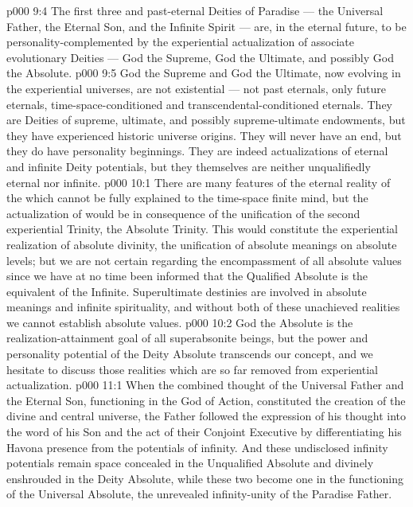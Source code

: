 \vs p000 9:4 The first three and past\hyp{}eternal Deities of Paradise --- the Universal Father, the Eternal Son, and the Infinite Spirit --- are, in the eternal future, to be personality\hyp{}complemented by the experiential actualization of associate evolutionary Deities --- God the Supreme, God the Ultimate, and possibly God the Absolute.
\vs p000 9:5 \pc God the Supreme and God the Ultimate, now evolving in the experiential universes, are not existential --- not past eternals, only future eternals, time\hyp{}space\hyp{}conditioned and transcendental\hyp{}conditioned eternals. They are Deities of supreme, ultimate, and possibly supreme\hyp{}ultimate endowments, but they have experienced historic universe origins. They will never have an end, but they do have personality beginnings. They are indeed actualizations of eternal and infinite Deity potentials, but they themselves are neither unqualifiedly eternal nor infinite.
\vs p000 10:1 There are many features of the eternal reality of the  which cannot be fully explained to the time\hyp{}space finite mind, but the actualization of  would be in consequence of the unification of the second experiential Trinity, the Absolute Trinity. This would constitute the experiential realization of absolute divinity, the unification of absolute meanings on absolute levels; but we are not certain regarding the encompassment of all absolute values since we have at no time been informed that the Qualified Absolute is the equivalent of the Infinite. Superultimate destinies are involved in absolute meanings and infinite spirituality, and without both of these unachieved realities we cannot establish absolute values.
\vs p000 10:2 God the Absolute is the realization\hyp{}attainment goal of all superabsonite beings, but the power and personality potential of the Deity Absolute transcends our concept, and we hesitate to discuss those realities which are so far removed from experiential actualization.
\vs p000 11:1 When the combined thought of the Universal Father and the Eternal Son, functioning in the God of Action, constituted the creation of the divine and central universe, the Father followed the expression of his thought into the word of his Son and the act of their Conjoint Executive by differentiating his Havona presence from the potentials of infinity. And these undisclosed infinity potentials remain space concealed in the Unqualified Absolute and divinely enshrouded in the Deity Absolute, while these two become one in the functioning of the Universal Absolute, the unrevealed infinity\hyp{}unity of the Paradise Father.
